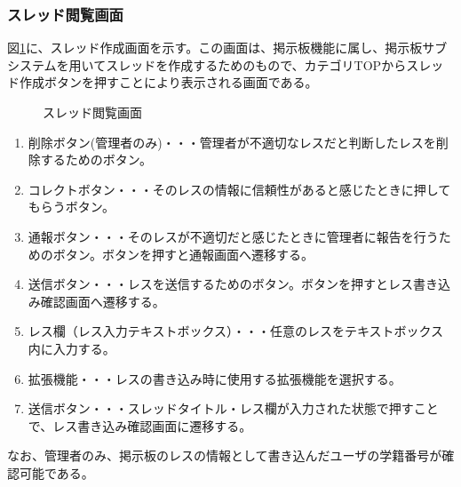 \documentclass[a4j]{jarticle}
\begin{document}
\subsubsection{スレッド閲覧画面}
図\ref{fig:read_thread}に、スレッド作成画面を示す。この画面は、掲示板機能に属し、掲示板サブシステムを用いてスレッドを作成するためのもので、カテゴリTOPからスレッド作成ボタンを押すことにより表示される画面である。\\
\begin{figure}[H]
\centering
{}
\caption{スレッド閲覧画面}
\label{fig:read_thread}
\end{figure}

\begin{enumerate}
  \renewcommand{\labelenumi}{\textcircled{\scriptsize \theenumi}}
\item 削除ボタン(管理者のみ)・・・管理者が不適切なレスだと判断したレスを削除するためのボタン。
\item コレクトボタン・・・そのレスの情報に信頼性があると感じたときに押してもらうボタン。
\item 通報ボタン・・・そのレスが不適切だと感じたときに管理者に報告を行うためのボタン。ボタンを押すと通報画面へ遷移する。
\item 送信ボタン・・・レスを送信するためのボタン。ボタンを押すとレス書き込み確認画面へ遷移する。

\item レス欄（レス入力テキストボックス）・・・任意のレスをテキストボックス内に入力する。

\item 拡張機能・・・レスの書き込み時に使用する拡張機能を選択する。

\item 送信ボタン・・・スレッドタイトル・レス欄が入力された状態で押すことで、レス書き込み確認画面に遷移する。

\end{enumerate}
なお、管理者のみ、掲示板のレスの情報として書き込んだユーザの学籍番号が確認可能である。
\end{document}
